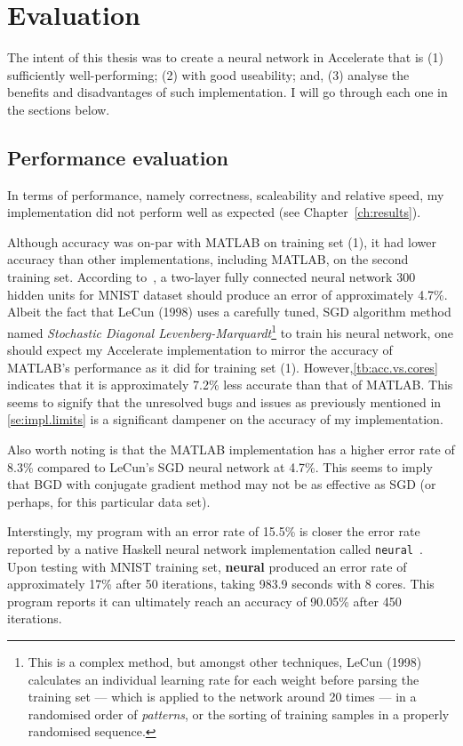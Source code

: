 \chapter{Evaluation}\label{ch:eval}

The intent of this thesis was to create a neural network in Accelerate that is (1) sufficiently well-performing; (2) with good useability; and, (3) analyse the benefits and disadvantages of such implementation. I will go through each one in the sections below.

\section{Performance evaluation} \label{se:eval.performance}

In terms of performance, namely correctness, scaleability and relative speed, my implementation did not perform well as expected (see Chapter~\ref{ch:results}).

Although accuracy was on-par with MATLAB on training set (1), it had lower accuracy than other implementations, including MATLAB, on the second training set. According to~\cite{LeC98}, a two-layer fully connected neural network 300 hidden units for MNIST dataset should produce an error of approximately 4.7\%. Albeit the fact that LeCun (1998) uses a carefully tuned, SGD algorithm method named \textit{Stochastic Diagonal Levenberg-Marquardt}\footnote{This is a complex method, but amongst other techniques, LeCun (1998) calculates an individual learning rate for each weight before parsing the training set --- which is applied to the network around 20 times --- in a randomised order of \textit{patterns}, or the sorting of training samples in a properly randomised sequence.} to train his neural network, one should expect my Accelerate implementation to mirror the accuracy of MATLAB's performance as it did for training set (1). However,\ref{tb:acc.vs.cores} indicates that it is approximately 7.2\% less accurate than that of MATLAB. This seems to signify that the unresolved bugs and issues as previously mentioned in \ref{se:impl.limits} is a significant dampener on the accuracy of my implementation.

Also worth noting is that the MATLAB implementation has a higher error rate of 8.3\% compared to LeCun's SGD neural network at 4.7\%. This seems to imply that BGD with conjugate gradient method may not be as effective as SGD (or perhaps, for this particular data set). 

Interstingly, my program with an error rate of 15.5\% is closer the error rate reported by a native Haskell neural network implementation called \texttt{neural}~\cite{Bru16}. Upon testing with MNIST training set, \textbf{neural} produced an error rate of approximately 17\% after 50 iterations, taking 983.9 seconds with 8 cores. This program reports it can ultimately reach an accuracy of 90.05\% after 450 iterations. 

